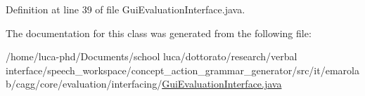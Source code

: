 Definition at line 39 of file Gui\-Evaluation\-Interface.\-java.



The documentation for this class was generated from the following file\-:\begin{DoxyCompactItemize}
\item 
/home/luca-\/phd/\-Documents/school luca/dottorato/research/verbal interface/speech\-\_\-workspace/concept\-\_\-action\-\_\-grammar\-\_\-generator/src/it/emarolab/cagg/core/evaluation/interfacing/\hyperlink{GuiEvaluationInterface_8java}{Gui\-Evaluation\-Interface.\-java}\end{DoxyCompactItemize}
